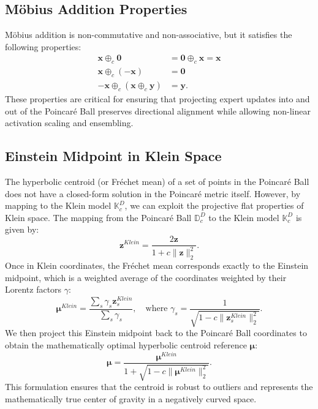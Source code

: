\documentclass{article}
\theoremstyle{plain}
\theoremstyle{definition}
\theoremstyle{remark}
\begin{document}
\subsection{Möbius Addition Properties}
Möbius addition is non-commutative and non-associative, but it satisfies the following properties:
\begin{align}
\mathbf{x} \oplus_c \mathbf{0} &= \mathbf{0} \oplus_c \mathbf{x} = \mathbf{x} \\
\mathbf{x} \oplus_c (-\mathbf{x}) &= \mathbf{0} \\
-\mathbf{x} \oplus_c (\mathbf{x} \oplus_c \mathbf{y}) &= \mathbf{y}.
\end{align}
These properties are critical for ensuring that projecting expert updates into and out of the Poincaré Ball preserves directional alignment while allowing non-linear activation scaling and ensembling.

\subsection{Einstein Midpoint in Klein Space}
The hyperbolic centroid (or Fréchet mean) of a set of points in the Poincaré Ball does not have a closed-form solution in the Poincaré metric itself. However, by mapping to the Klein model $\mathbb{K}_c^D$, we can exploit the projective flat properties of Klein space. The mapping from the Poincaré Ball $\mathbb{D}_c^D$ to the Klein model $\mathbb{K}_c^D$ is given by:
\begin{equation}
\mathbf{z}^{Klein} = \frac{2 \mathbf{z}}{1 + c \|\mathbf{z}\|_2^2}.
\end{equation}
Once in Klein coordinates, the Fréchet mean corresponds exactly to the Einstein midpoint, which is a weighted average of the coordinates weighted by their Lorentz factors $\gamma$:
\begin{equation}
\boldsymbol{\mu}^{Klein} = \frac{\sum_{s} \gamma_s \mathbf{z}_s^{Klein}}{\sum_{s} \gamma_s}, \quad \text{where } \gamma_s = \frac{1}{\sqrt{1 - c \|\mathbf{z}_s^{Klein}\|_2^2}}.
\end{equation}
We then project this Einstein midpoint back to the Poincaré Ball coordinates to obtain the mathematically optimal hyperbolic centroid reference $\boldsymbol{\mu}$:
\begin{equation}
\boldsymbol{\mu} = \frac{\boldsymbol{\mu}^{Klein}}{1 + \sqrt{1 - c \|\boldsymbol{\mu}^{Klein}\|_2^2}}.
\end{equation}
This formulation ensures that the centroid is robust to outliers and represents the mathematically true center of gravity in a negatively curved space.
\end{document}
